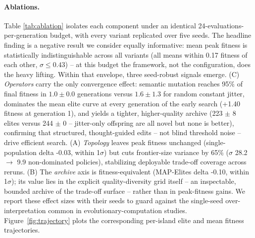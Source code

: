 \documentclass[11pt]{article}
\begin{document}
\paragraph{Ablations.} Table \ref{tab:ablation} isolates each component under an identical 24-evaluations-per-generation budget, with every variant replicated over five seeds. The headline finding is a negative result we consider equally informative: mean peak fitness is statistically indistinguishable across all variants (all means within 0.17 fitness of each other, $\sigma \leq 0.43$) -- at this budget the framework, not the configuration, does the heavy lifting. Within that envelope, three seed-robust signals emerge. (C) \emph{Operators} carry the only convergence effect: semantic mutation reaches 95\% of final fitness in $1.0 \pm 0.0$ generations versus $1.6 \pm 1.3$ for random constant jitter, dominates the mean elite curve at every generation of the early search (+1.40 fitness at generation 1), and yields a tighter, higher-quality archive (223 $\pm$ 8 elites versus 244 $\pm$ 0 -- jitter-only offspring are all novel but none is better), confirming that structured, thought-guided edits -- not blind threshold noise -- drive efficient search. (A) \emph{Topology} leaves peak fitness unchanged (single-population delta -0.03, within 1$\sigma$) but cuts frontier-size variance by 65\% ($\sigma$ 28.2 $\to$ 9.9 non-dominated policies), stabilizing deployable trade-off coverage across reruns. (B) The \emph{archive} axis is fitness-equivalent (MAP-Elites delta -0.10, within 1$\sigma$); its value lies in the explicit quality-diversity grid itself -- an inspectable, bounded archive of the trade-off surface -- rather than in peak-fitness gains. We report these effect sizes with their seeds to guard against the single-seed over-interpretation common in evolutionary-computation studies. Figure~\ref{fig:trajectory} plots the corresponding per-island elite and mean fitness trajectories.
\end{document}

